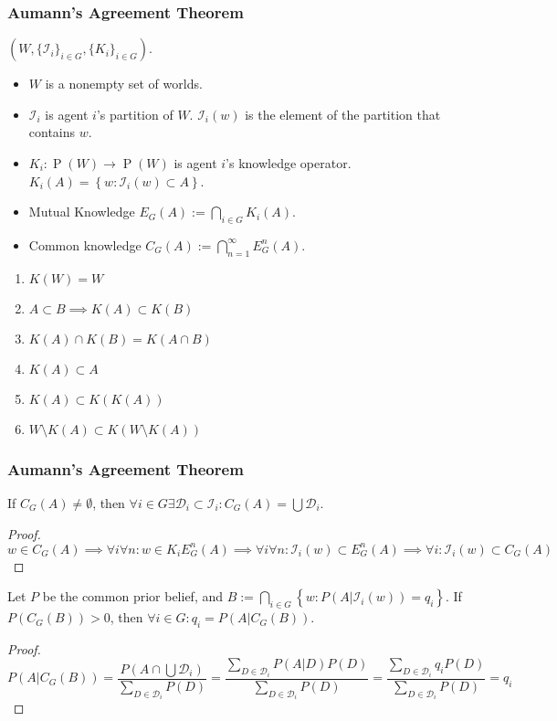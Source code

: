 \documentclass[UTF8,aspectratio=43,11pt,colorlinks,compress,openany]{beamer}%
\begin{document}
\begin{frame}\frametitle{Aumann's Agreement Theorem}
$\left(W,\{\mathcal{I}_i\}_{i\in G},\{K_i\}_{i\in G}\right)$.
\begin{itemize}
\item $W$ is a nonempty set of worlds.\\
\item $\mathcal{I}_i$ is agent $i$'s partition of $W$. $\mathcal{I}_i(w)$ is the element of the partition that contains $w$.\\
\item $K_i: \operatorname{P}(W)\to \operatorname{P}(W)$ is agent $i$'s knowledge operator. 
$K_i(A)=\left\{w: \mathcal{I}_i(w)\subset A\right\}$.\\
\item Mutual Knowledge $E_G(A):=\bigcap\limits_{i\in G}K_i(A)$.\\
\item Common knowledge $C_G(A):=\bigcap\limits_{n=1}^\infty E_G^n(A)$.
\end{itemize}
\begin{enumerate}
	\item $K(W)=W$
	\item $A\subset B\implies K(A)\subset K(B)$
	\item $K(A)\cap K(B)=K(A\cap B)$
	\item $K(A)\subset A$
	\item $K(A)\subset K(K(A))$
	\item $W\setminus K(A)\subset K(W\setminus K(A))$
\end{enumerate}
\end{frame}

\begin{frame}\frametitle{Aumann's Agreement Theorem}
\setlength\abovedisplayskip{0pt}
\setlength\belowdisplayskip{0pt}
\begin{lemma}
If $C_G(A)\ne\emptyset$, then $\forall i\in G\exists \mathcal{D}_i\subset \mathcal{I}_i: C_G(A)=\bigcup \mathcal{D}_i$.
\end{lemma}
\begin{proof}
$w\in C_G(A)\implies\forall i\forall n: w\in K_iE_G^n(A)\implies\forall i\forall n: \mathcal{I}_i(w)\subset E_G^n(A)\implies\forall i: \mathcal{I}_i(w)\subset C_G(A)$
\end{proof}
\begin{theorem}
Let $P$ be the common prior belief, and $B:=\bigcap\limits_{i\in G}\left\{w: P(A|\mathcal{I}_i(w))=q_i\right\}$. If $P\left(C_G(B)\right)>0$, then $\forall i\in G: q_i=P(A|C_G(B))$.
\end{theorem}
\begin{proof}
\[P(A|C_G(B))=\frac{P(A\cap\bigcup \mathcal{D}_i)}{\sum\limits_{D\in\mathcal{D}_i}P(D)}=\frac{\sum\limits_{D\in \mathcal{D}_i}P(A|D)P(D)}{\sum\limits_{D\in \mathcal{D}_i}P(D)}=\frac{\sum\limits_{D\in\mathcal{D}_i}q_iP(D)}{\sum\limits_{D\in \mathcal{D}_i}P(D)}=q_i\]
\end{proof}
\end{frame}
\end{document}
